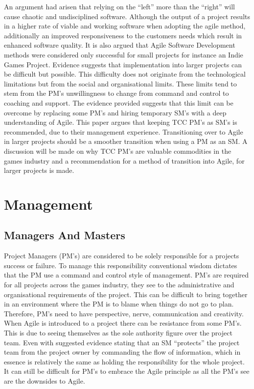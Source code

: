 \documentclass{scrartcl}
\begin{document}
An argument had arisen that relying on the ``left'' more than the ``right'' will cause chaotic and undisciplined software\cite{ready,Chaos}. Although the output of a project results in a higher rate of viable and working software when adopting the agile method, additionally an improved responsiveness to the customers needs which result in enhanced software quality\cite{LeaderUnleashed,MasterActivities}. It is also argued that Agile Software Development methods were considered only successful for small projects for instance an Indie Games Project\cite{ready,extreme}. Evidence suggests that implementation into larger projects can be difficult but possible\cite{MasterActivities}. This difficulty does not originate from the technological limitations but from the social and organisational limits\cite{SocialAgile}. These limits tend to stem from the PM's unwillingness to change from command and control to coaching and support. The evidence provided suggests that this limit can be overcome by replacing some PM's and hiring temporary SM's with a deep understanding of Agile\cite{Together}. This paper argues that keeping TCC PM's as SM's is recommended, due to their management experience. Transitioning over to Agile in larger projects should be a smoother transition when using a PM as an SM. A discussion will be made on why TCC PM's are valuable commodities in the games industry and a recommendation for a method of transition into Agile, for larger projects is made. 

\section{Management}


\subsection{Managers And Masters}
 
Project Managers (PM's) are considered to be solely responsible for a projects success or failure\cite{Behavior}. To manage this responsibility conventional wisdom dictates that the PM use a command and control style of management\cite{MasterActivities}. PM's are required for all projects across the games industry, they see to the administrative and organisational requirements of the project\cite{Oxymoron}. This can be difficult to bring together in an environment where the PM is to blame when things do not go to plan. Therefore, PM's need to have perspective, nerve, communication and creativity\cite{Oxymoron}. When Agile is introduced to a project there can be resistance from some PM's. This is due to seeing themselves as the sole authority figure over the project team. Even with suggested evidence stating that an SM ``protects'' the project team from the project owner by commanding the flow of information, which in essence is relatively the same as holding the responsibility for the whole project. It can still be difficult for PM's to embrace the Agile principle\cite{Leader,ready} as all the PM's see are the downsides to Agile\cite{ready}.
\newline
 
\end{document}
